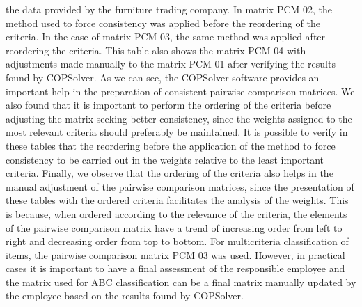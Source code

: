 \documentclass[10pt,fleqn,a4paper,twoside]{article}
\begin{document}
the data provided by the furniture trading company. In matrix PCM 02, the method used to force consistency was applied before the reordering of the criteria. In the case of matrix PCM 03, the same method was applied after reordering the criteria. This table also shows the matrix PCM 04 with adjustments made manually to the matrix PCM 01 after verifying the results found by COPSolver. As we can see, the COPSolver software provides an important help in the preparation of consistent pairwise comparison matrices. We also found that it is important to perform the ordering of the criteria before adjusting the matrix seeking better consistency, since the weights assigned to the most relevant criteria should preferably be maintained. It is possible to verify in these tables that the reordering before the application of the method to force consistency to be carried out in the weights relative to the least important criteria. Finally, we observe that the ordering of the criteria also helps in the manual adjustment of the pairwise comparison matrices, since the presentation of these tables with the ordered criteria facilitates the analysis of the weights. This is because, when ordered according to the relevance of the criteria, the elements of the pairwise comparison matrix have a trend of increasing order from left to right and decreasing order from top to bottom. For multicriteria classification of items, the pairwise comparison matrix PCM 03 was used. However, in practical cases it is important to have a final assessment of the responsible employee and the matrix used for ABC classification can be a final matrix manually updated by the employee based on the results found by COPSolver.
\end{document}
